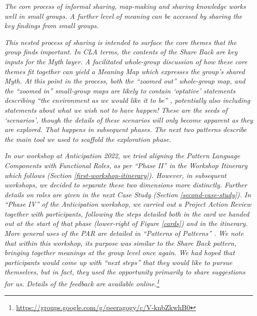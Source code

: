 \documentclass[acmlarge,timestamp]{acmart}
\begin{document}


\smallskip
\noindent \emph{The core process of informal sharing, map-making and
sharing knowledge works well in small groups.  A further level of
meaning can be accessed by sharing the key findings from small
groups.}



\smallskip
\noindent \emph{This nested process of sharing is intended to surface
the core themes that the group finds important.  In CLA terms, the
contents of the {\sc Share Back} are key inputs for the Myth layer.  A
facilitated whole-group discussion of how these core themes fit
together can yield a {\sc Meaning Map} which expresses the group’s
shared Myth.  At this point in the process, both the “zoomed out”
whole-group map, and the “zoomed in” small-group maps are likely to
contain ‘optative’ statements describing “the environment as we would
like it to be” \cite{zave1997four}, potentially also including
statements about what we wish not to have happen!  These are the seeds
of ‘scenarios’, though the details of these scenarios will only become
apparent as they are explored.  That happens in subsequent phases.
The next two patterns describe the main tool we used to scaffold the
exploration phase.}





\smallskip

\noindent \emph{In our workshop at Anticipation 2022, we tried
aligning the {\sc Pattern Language Components} with {\sc Functional
  Roles}, as per “Phase II” in the Workshop Itinerary which follows
(Section \ref{first-workshop-itinerary}).  However, in subsequent
workshops, we decided to separate these two dimensions more
distinctly.  Further details on roles are given in the next Case Study
(Section \ref{second-case-study}).  In “Phase IV” of the Anticipation
workshop, we carried out a Project Action Review together with
participants, following the steps detailed both in the card we handed
out at the start of that phase (lower-right of Figure \ref{cards}) and
in the itinerary.  More general uses of the PAR are detailed in
“Patterns of Patterns” \cite{patterns-of-patterns-i}.  We note that
within this workshop, its purpose was similar to the {\sc Share Back}
pattern, bringing together meanings at the group level once again.  We
had hoped that participants would come up with “next steps” that they
would like to pursue themselves, but in fact, they used the
opportunity primarily to share suggestions for us.  Details of the
feedback are available
online.\footnote{\url{https://groups.google.com/g/peeragogy/c/V-knbZkwhB0}}}
\end{document}
